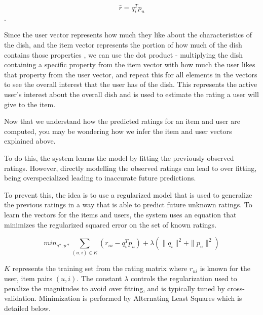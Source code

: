 \begin{equation}\label{eq:1}\tag{1} \widehat{r} = q_{i}^T p_{u} \end{equation}.


Since the user vector represents how much they like about the characteristics of the dish, and the item vector represents the portion of how much of the dish contains those properties \cite{koren2009matrix}, we can use the dot product - multiplying the dish containing a specific property from the item vector with how much the user likes that property from the user vector, and repeat this for all elements in the vectors to see the overall interest that the user has of the dish. This represents the active user's interest about the overall dish and is used to estimate the rating a user will give to the item. 

Now that we understand how the predicted ratings for an item and user are computed, you may be wondering how we infer the item and user vectors explained above. 

To do this, the system learns the model by fitting the previously observed ratings. However, directly modelling the observed ratings can lead to over fitting, being overspecialized leading to inaccurate future predictions.

To prevent this, the idea is to use a regularized model that is used to generalize the previous ratings in a way that is able to predict future unknown ratings. To learn the vectors for the items and users, the system uses an equation that minimizes the regularized squared error on the set of known ratings.

\begin{equation}\label{eq:2}\tag{2}
\displaystyle min_{q*,p*} \sum_{ (u,i) \in K} (r_{ui} - q_{i}^T p_{u}) + \lambda (\| q_{i} \|^2 + \| p_{u} \|^2 )
\end{equation}

\begin{math} K \end{math} represents the training set from the rating matrix where \begin{math} r_{ui} \end{math} is known for the user, item pairs \begin{math} (u,i) \end{math}. The constant \begin{math}\lambda\end{math} controls the regularization used to penalize the magnitudes to avoid over fitting, and is typically tuned by cross-validation. Minimization is performed by Alternating Least Squares \cite{koren2011}  which is detailed below. 

